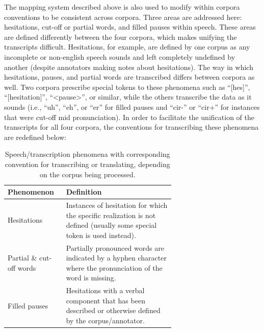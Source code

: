 \documentclass[12pt]{article}
\begin{document}
The mapping system described above is also used to modify within corpora conventions to be consistent across corpora. Three areas are addressed here:
hesitations, cut-off or partial words, and filled pauses within speech. These areas are defined differently between the four corpora, which makes
unifying the transcripts difficult. Hesitations, for example, are defined by one corpus as any incomplete or non-english speech sounds and left
completely undefined by another (despite annotators making notes about hesitations). The way in which hesitations, pauses, and partial words are
transcribed differs between corpora as well. Two corpora prescribe special tokens to these phenomena such as ``[hes]'', ``[hesitation]'', ``<pause>'',
or similar, while the others transcribe the data as it sounds (i.e., ``uh'', ``eh'', or ``er'' for filled pauses and ``cir-'' or ``cir+'' for
instances that were cut-off mid pronunciation). In order to facilitate the unification of the transcripts for all four corpora, the conventions for
transcribing these phenomena are redefined below:

\begin{table}[h!]
    \centering
    \begin{tabular}{l p{0.65\linewidth}}
        \toprule
        Phenomenon               & Definition                                                                                                              \\
        \midrule
        Hesitations              & Instances of hesitation for which the specific realization is not defined (usually some special token is used instead). \\
        \midrule
        Partial \& cut-off words & Partially pronounced words are indicated by a hyphen character where the pronunciation of the word is missing.          \\
        \midrule
        Filled pauses            & Hesitations with a verbal component that has been described or otherwise defined by the corpus/annotator.               \\
        \bottomrule
    \end{tabular}
    \caption{Speech/transcription phenomena with corresponding convention for transcribing or translating, depending on the corpus being processed.}
    \label{tab:phenomena_definitions}
\end{table}
\end{document}
